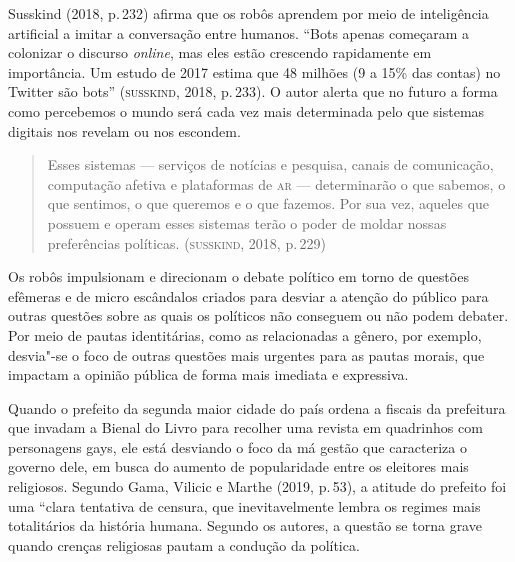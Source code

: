 Susskind (2018, p.\,232) afirma que os robôs aprendem por meio de
inteligência artificial a imitar a conversação entre humanos. ``Bots
apenas começaram a colonizar o discurso \textit{online}, mas eles estão
crescendo rapidamente em importância. Um estudo de 2017 estima que 48
milhões (9 a 15\% das contas) no Twitter são bots'' (\textsc{susskind},
2018, p.\,233). O autor alerta que no futuro a forma como percebemos o
mundo será cada vez mais determinada pelo que sistemas digitais nos
revelam ou nos escondem.

\begin{quote}
Esses sistemas --- serviços de notícias e pesquisa, canais de
comunicação, computação afetiva e plataformas de \textsc{ar} --- determinarão o
que sabemos, o que sentimos, o que queremos e o que fazemos. Por sua
vez, aqueles que possuem e operam esses sistemas terão o poder de moldar
nossas preferências políticas. (\textsc{susskind}, 2018, p.\,229)
\end{quote}

Os robôs impulsionam e direcionam o debate político em torno de questões
efêmeras e de micro escândalos criados para desviar a atenção do público
para outras questões sobre as quais os políticos não conseguem ou não
podem debater. Por meio de pautas identitárias, como as relacionadas a
gênero, por exemplo, desvia"-se o foco de outras questões mais urgentes
para as pautas morais, que impactam a opinião pública de forma mais
imediata e expressiva.

Quando o prefeito da segunda maior cidade do país ordena a fiscais da
prefeitura que invadam a Bienal do Livro para recolher uma revista em
quadrinhos com personagens gays, ele está desviando o foco da má gestão
que caracteriza o governo dele, em busca do aumento de popularidade
entre os eleitores mais religiosos. Segundo Gama, Vilicic e Marthe
(2019, p.\,53), a atitude do prefeito foi uma ``clara tentativa de
censura, que inevitavelmente lembra os regimes mais totalitários da
história humana. Segundo os autores, a questão se torna grave quando
crenças religiosas pautam a condução da política.

